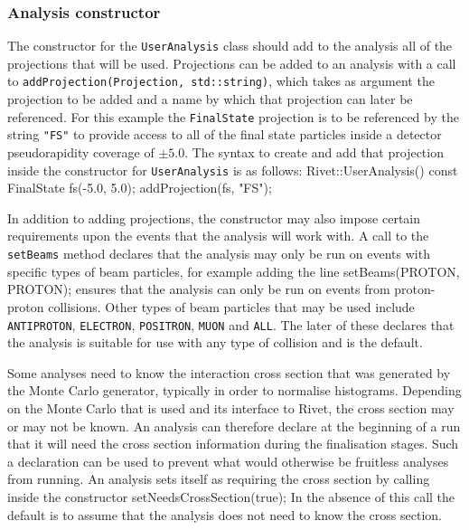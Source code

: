 \documentclass{JHEP3}
\newenvironment{snippet}{\Verbatim}{\endVerbatim}
\newcommand{\code}[1]{\texttt{#1}\xspace}
\begin{document}
\subsubsection{Analysis constructor}
The constructor for the \code{UserAnalysis} class should add to the analysis all
of the projections that will be used.  Projections can be added to an analysis
with a call to \code{addProjection(Projection, std::string)}, which takes as
argument the projection to be added and a name by which that projection can
later be referenced.  For this example the \code{FinalState} projection is to be
referenced by the string \code{"FS"} to provide access to all of the final state
particles inside a detector pseudorapidity coverage of $\pm 5.0$.  The syntax to
create and add that projection inside the constructor for \code{UserAnalysis} is
as follows:
%
\begin{snippet}
Rivet::UserAnalysis() {
  const FinalState fs(-5.0, 5.0);
  addProjection(fs, "FS");
}
\end{snippet}

In addition to adding projections, the constructor may also impose certain
requirements upon the events that the analysis will work with.  A call to the
\code{setBeams} method declares that the analysis may only be run on events with
specific types of beam particles, for example adding the line
%
\begin{snippet}
  setBeams(PROTON, PROTON);
\end{snippet}
%
\noindent ensures that the analysis can only be run on events from proton-proton
collisions.  Other types of beam particles that may be used include
\code{ANTIPROTON}, \code{ELECTRON}, \code{POSITRON}, \code{MUON} and \code{ALL}.
The later of these declares that the analysis is suitable for use with any type
of collision and is the default.

Some analyses need to know the interaction cross section that was generated by
the Monte Carlo generator, typically in order to normalise histograms.
Depending on the Monte Carlo that is used and its interface to Rivet, the cross
section may or may not be known.  An analysis can therefore declare at the
beginning of a run that it will need the cross section information during the
finalisation stages.  Such a declaration can be used to prevent what would
otherwise be fruitless analyses from running.  An analysis sets itself as
requiring the cross section by calling inside the constructor
%
\begin{snippet}
  setNeedsCrossSection(true);
\end{snippet}
%
\noindent In the absence of this call the default is to assume that the analysis
does not need to know the cross section.
\end{document}
